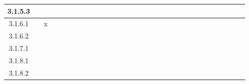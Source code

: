 \documentclass[titlepage]{article}
\begin{document}
\begin{center}
\begin{tabular}{ | c || c | c | c | c | c | c | c | c | c | c | c | c | c | c | c | c | c | c | c | c | c | c | c | c | c | c | c | c | c | c |}
   3.1.5.3 & & & & & & & & & & & & & & & & & & & & & & & & & & & & & & \\ \hline
   3.1.6.1 & &x& & & & & & & & & & & & & & & & & & & & & & & & & & & & \\ \hline
   3.1.6.2 & & & & & & & & & & & & & & & & & & & & & & & & & & & & & & \\ \hline
   3.1.7.1 & & & & & & & & & & & & & & & & & & & & & & & & & & & & & & \\ \hline
   3.1.8.1 & & & & & & & & & & & & & & & & & & & & & & & & & & & & & & \\ \hline
   3.1.8.2 & & & & & & & & & & & & & & & & & & & & & & & & & & & & & & \\ \hline

\end{tabular}
\end{center}

\pagebreak
\end{document}

